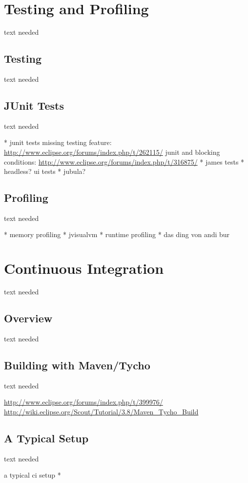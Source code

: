\documentclass[a4paper,10pt,twoside]{book}
\begin{document}
  \sloppy
\fi


\chapter{Testing and Profiling}
text needed

\section{Testing}
text needed

\section{JUnit Tests}
text needed

  * junit tests
  missing testing feature: \url{http://www.eclipse.org/forums/index.php/t/262115/}
  junit and blocking conditions: \url{http://www.eclipse.org/forums/index.php/t/316875/}
  * james tests
  * headless? ui tests 
  * jubula?

\section{Profiling}
text needed

  * memory profiling
    * jvisualvm
  * runtime profiling
    * das ding von andi bur


\chapter{Continuous Integration}
text needed

\section{Overview}
text needed

\section{Building with Maven/Tycho}
text needed
 
\url{http://www.eclipse.org/forums/index.php/t/399976/}
\url{http://wiki.eclipse.org/Scout/Tutorial/3.8/Maven_Tycho_Build}

\section{A Typical Setup}
text needed

  a typical ci setup
  * 


\ifx\wholebook\relax\else
   
   
\end{document}
